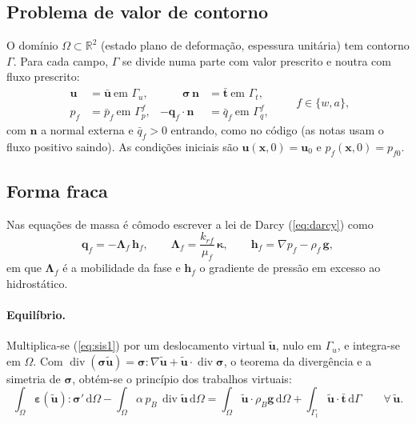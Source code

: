 \documentclass[11pt,a4paper]{article}
\newcommand{\vu}{\bm u}
\newcommand{\vq}{\bm q}
\newcommand{\vg}{\bm g}
\newcommand{\vt}{\bm t}
\newcommand{\tsig}{\bm\sigma}
\newcommand{\teps}{\bm\varepsilon}
\newcommand{\tkap}{\bm\kappa}
\newcommand{\dv}{\operatorname{div}}
\newcommand{\dd}{\mathrm d}
\begin{document}
\subsection{Problema de valor de contorno}
O domínio $\Omega\subset\mathbb R^2$ (estado plano de deformação, espessura unitária) tem
contorno $\Gamma$. Para cada campo, $\Gamma$ se divide numa parte com valor prescrito e
noutra com fluxo prescrito:
\begin{equation}
\begin{aligned}
\vu&=\bar{\vu}\ \text{em }\Gamma_u, &\qquad \tsig\,\bm n&=\bar{\vt}\ \text{em }\Gamma_t,\\
p_f&=\bar p_f\ \text{em }\Gamma_p^f, & -\vq_f\cdot\bm n&=\bar q_f\ \text{em }\Gamma_q^f,
\end{aligned}
\qquad f\in\{w,a\},
\label{eq:pvc}
\end{equation}
com $\bm n$ a normal externa e $\bar q_f>0$ entrando, como no código (as notas usam o fluxo
positivo saindo). As condições iniciais são $\vu(\bm x,0)=\vu_0$ e $p_f(\bm x,0)=p_{f0}$.

\subsection{Forma fraca}
Nas equações de massa é cômodo escrever a lei de Darcy (\ref{eq:darcy}) como
\begin{equation}
\vq_f=-\bm\Lambda_f\,\bm h_f,\qquad
\bm\Lambda_f=\frac{k_{rf}}{\mu_f}\,\tkap,\qquad
\bm h_f=\nabla p_f-\rho_f\,\vg ,
\label{eq:mobilidade}
\end{equation}
em que $\bm\Lambda_f$ é a mobilidade da fase e $\bm h_f$ o gradiente de pressão em excesso
ao hidrostático.

\paragraph{Equilíbrio.} Multiplica-se (\ref{eq:sis1}) por um deslocamento virtual
$\tilde{\vu}$, nulo em $\Gamma_u$, e integra-se em $\Omega$. Com
$\dv(\tsig\tilde{\vu})=\tsig:\nabla\tilde{\vu}+\tilde{\vu}\cdot\dv\tsig$, o teorema da
divergência e a simetria de $\tsig$, obtém-se o princípio dos trabalhos virtuais:
\begin{equation}
\int_\Omega\teps(\tilde{\vu}):\tsig'\,\dd\Omega
-\int_\Omega\alpha\,p_B\,\dv\tilde{\vu}\,\dd\Omega
=\int_\Omega\tilde{\vu}\cdot\rho_B\vg\,\dd\Omega
+\int_{\Gamma_t}\tilde{\vu}\cdot\bar{\vt}\,\dd\Gamma
\qquad\forall\,\tilde{\vu}.
\label{eq:fraca_u}
\end{equation}
\end{document}
